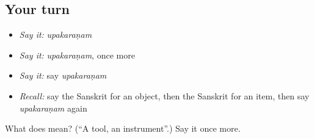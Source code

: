 \subsection*{Your turn}
\begin{itemize}
\raggedright
  \item \emph{Say it:} \emph{upakaraṇam}
  \item \emph{Say it:} \emph{upakaraṇam}, once more
  \item \emph{Say it:} say \emph{upakaraṇam}
  \item \emph{Recall:} say the Sanskrit for an object, then the Sanskrit for an item, then say \emph{upakaraṇam} again
\end{itemize}

\begin{tcolorbox}[breakable,colback=teal!4,colframe=teal!35!black,title={Before you move on}]
What does  mean? (\textquotedblleft{}A tool, an instrument\textquotedblright{}.) Say it once more.
\end{tcolorbox}
